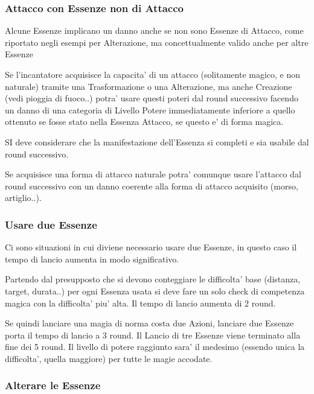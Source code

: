 \documentclass[a4paper,11pt,twoside,openany]{book}
\begin{document}
\label{altre-regole}

\subsubsection{Attacco con Essenze non di Attacco}

Alcune Essenze implicano un danno anche se non sono Essenze di Attacco, come riportato negli esempi per Alterazione, ma concettualmente valido anche per altre Essenze

Se l'incantatore acquisisce la capacita' di un attacco (solitamente magico, e non naturale) tramite una Trasformazione o una Alterazione, ma anche Creazione (vedi pioggia di fuoco..) potra' usare questi poteri dal round successivo facendo un danno di una categoria di Livello Potere immediatamente inferiore a quello ottenuto se fosse stato nella Essenza Attacco, se questo e' di forma magica.

SI deve considerare che la manifestazione dell'Essenza si completi e sia usabile dal round successivo.

Se acquisisce una forma di attacco naturale potra' comunque usare l'attacco dal round successivo con un danno coerente alla forma di attacco acquisito (morso, artiglio..).

\subsubsection{Usare due Essenze}

Ci sono situazioni in cui diviene necessario usare due Essenze, in questo caso il tempo di lancio aumenta in modo significativo.

Partendo dal presupposto che si devono conteggiare le difficolta' base (distanza, target, durata..) per ogni Essenza usata si deve fare un solo check di competenza magica con la difficolta' piu' alta. Il tempo di lancio aumenta di 2 round.

Se quindi lanciare una magia di norma costa due Azioni, lanciare due Essenze porta il tempo di lancio a 3 round. Il Lancio di tre Essenze viene terminato alla fine dei 5 round. Il livello di potere raggiunto sara' il medesimo (essendo unica la difficolta', quella maggiore) per tutte le magie accodate.

\subsubsection{Alterare le Essenze}
\end{document}
